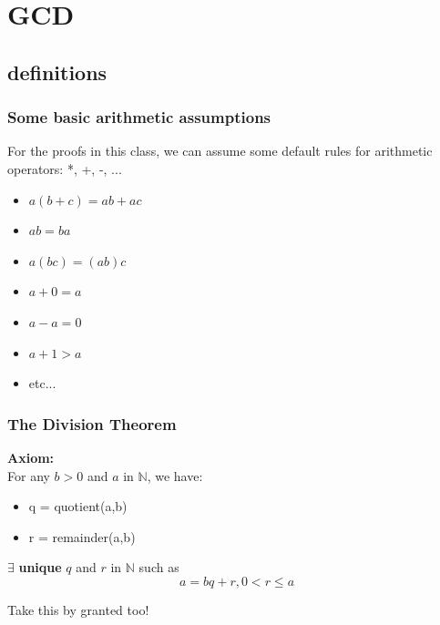 \documentclass{beamer}
\begin{document}
\section{GCD}
\subsection{definitions}

\begin{frame}
  \frametitle{Some basic arithmetic assumptions}

  {\larger  
    For the proofs in this class, we can assume some default rules for
    arithmetic operators: *, +, -, ...

    \bigskip

    \begin{itemize}
    \item $a (b+c) = ab + ac$
    \item $ab = ba$
    \item $a(bc) = (ab)c$
    \item $a + 0 = a$
    \item $a - a = 0$
    \item $a + 1 > a$
    \item etc...
    \end{itemize}
    
  }
\end{frame}

\begin{frame}
  \frametitle{The Division Theorem}

  {\larger
    {\bf Axiom:}\\
    For any $b > 0$ and $a$ in $\mathbb{N}$, we have:

    \bigskip
    
    \begin{itemize}
    \item q = quotient(a,b)
    \item r = remainder(a,b)
    \end{itemize}

    \bigskip

    $\exists$ {\bf unique} $q$ and $r$ in $\mathbb{N}$ such as
    \begin{equation*}
      a = bq + r, 0 < r \leq a
    \end{equation*}

    \bigskip

    Take this by granted too!
  }
\end{frame}
\end{document}
